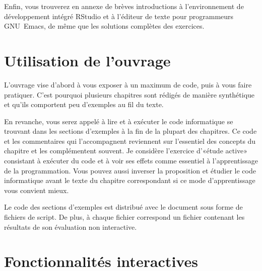 Enfin, vous trouverez en annexe de brèves introductions à
l'environnement de développement intégré RStudio et à l'éditeur de
texte pour programmeurs GNU~Emacs, de même que les solutions complètes
des exercices.

\section*{Utilisation de l'ouvrage}

L'ouvrage vise d'abord à vous exposer à un maximum de code, puis à
vous faire pratiquer. C'est pourquoi plusieurs chapitres sont rédigés
de manière synthétique et qu'ils comportent peu d'exemples au fil du
texte.

En revanche, vous serez appelé à lire et à exécuter le code
informatique se trouvant dans les sections d'exemples à la fin de la
plupart des chapitres. Ce code et les commentaires qui l'accompagnent
reviennent sur l'essentiel des concepts du chapitre et les
complémentent souvent. Je considère l'exercice d'«étude active»
consistant à exécuter du code et à voir ses effets comme essentiel à
l'apprentissage de la programmation. Vous pouvez aussi inverser la
proposition et étudier le code informatique avant le texte du chapitre
correspondant si ce mode d'apprentissage vous convient mieux.

Le code des sections d'exemples est distribué avec le document sous
forme de fichiers de script. De plus, à chaque fichier 
correspond un fichier  contenant les résultats de son
évaluation non interactive.


\section*{Fonctionnalités interactives}

